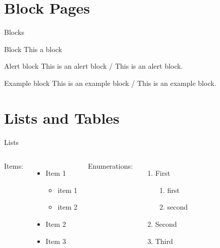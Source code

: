 \documentclass{beamer}
\begin{document}
\section{Block Pages}

\begin{frame}{Blocks}
    \begin{block}{Block}
        This a block
    \end{block}
    \pause
    \begin{alertblock}{Alert block}
        This is an alert block / \textcolor{alert}{This is an alert block}.
    \end{alertblock}
    \pause
    \begin{exampleblock}{Example block}
        This is an example block / \textcolor{example}{This is an example block}.
    \end{exampleblock}
\end{frame}

\section{Lists and Tables}

\begin{frame}{Lists}
    \begin{columns}[t, onlytextwidth]
            Items:
            \begin{itemize}
                \item Item 1
                \begin{itemize}
                    \item item 1
                    \item item 2
                \end{itemize}
                \item Item 2
                \item Item 3
            \end{itemize}
        
            Enumerations:
            \begin{enumerate}
                \item First
                \begin{enumerate}
                    \item first
                    \item second
                \end{enumerate}
                \item Second
                \item Third
            \end{enumerate}
    \end{columns}
\end{frame}
\end{document}
